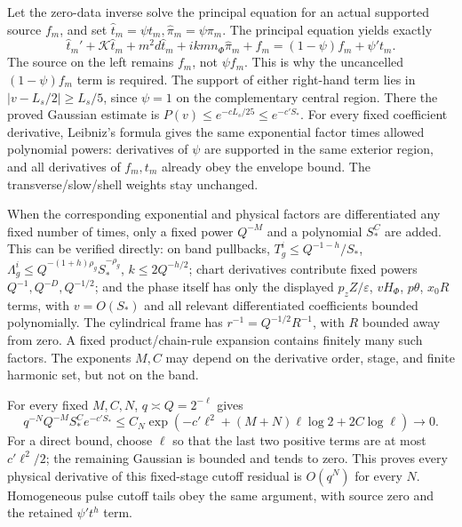 \documentclass[10pt,a4paper]{article}
\begin{document}
Let the zero-data inverse solve the principal equation for an actual supported source \(f_m\), and set \(\widehat t_m=\psi t_m,\widehat\pi_m=\psi\pi_m\). The principal equation yields exactly \[
\widehat t_m'+\mathcal K\widehat t_m+m^2d\widehat t_m
+ikmn_\Phi\widehat\pi_m+f_m
=(1-\psi)f_m+\psi't_m.
\] The source on the left remains \(f_m\), not \(\psi f_m\). This is why the uncancelled \((1-\psi)f_m\) term is required. The support of either right-hand term lies in \(|v-L_s/2|\ge L_s/5\), since \(\psi=1\) on the complementary central region. There the proved Gaussian estimate is \(P(v)\le e^{-cL_s/25}\le e^{-c'S_*}\). For every fixed coefficient derivative, Leibniz's formula gives the same exponential factor times allowed polynomial powers: derivatives of \(\psi\) are supported in the same exterior region, and all derivatives of \(f_m,t_m\) already obey the envelope bound. The transverse/slow/shell weights stay unchanged.

When the corresponding exponential and physical factors are differentiated any fixed number of times, only a fixed power \(Q^{-M}\) and a polynomial \(S_*^C\) are added. This can be verified directly: on band pullbacks, \(T_g^i\le Q^{-1-h}/S_*\), \(\Lambda_g^i\le Q^{-(1+h)\rho_g}S_*^{-\rho_g}\), \(k\le2Q^{-h/2}\); chart derivatives contribute fixed powers \(Q^{-1},Q^{-D},Q^{-1/2}\); and the phase itself has only the displayed \(p_zZ/\varepsilon\), \(vH_\Phi\), \(p\theta\), \(x_0R\) terms, with \(v=O(S_*)\) and all relevant differentiated coefficients bounded polynomially. The cylindrical frame has \(r^{-1}=Q^{-1/2}R^{-1}\), with \(R\) bounded away from zero. A fixed product/chain-rule expansion contains finitely many such factors. The exponents \(M,C\) may depend on the derivative order, stage, and finite harmonic set, but not on the band.

For every fixed \(M,C,N\), \(q\asymp Q=2^{-\ell}\) gives \[
q^{-N}Q^{-M}S_*^Ce^{-c'S_*}
\le C_N\exp(-c'\ell^2+(M+N)\ell\log2+2C\log\ell)\longrightarrow0.
\] For a direct bound, choose \(\ell\) so that the last two positive terms are at most \(c'\ell^2/2\); the remaining Gaussian is bounded and tends to zero. This proves every physical derivative of this fixed-stage cutoff residual is \(O(q^N)\) for every \(N\). Homogeneous pulse cutoff tails obey the same argument, with source zero and the retained \(\psi't^h\) term.
\end{document}
